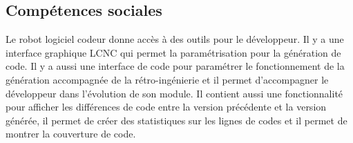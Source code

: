 \subsection{Compétences sociales}
Le robot logiciel codeur donne accès à des outils pour le développeur. Il y a une interface graphique LCNC qui permet la paramétrisation pour la génération de code. Il y a aussi une interface de code pour paramétrer le fonctionnement de la génération accompagnée de la rétro-ingénierie et il permet d'accompagner le développeur dans l'évolution de son module. Il contient aussi une fonctionnalité pour afficher les différences de code entre la version précédente et la version générée, il permet de créer des statistiques sur les lignes de codes et il permet de montrer la couverture de code.









